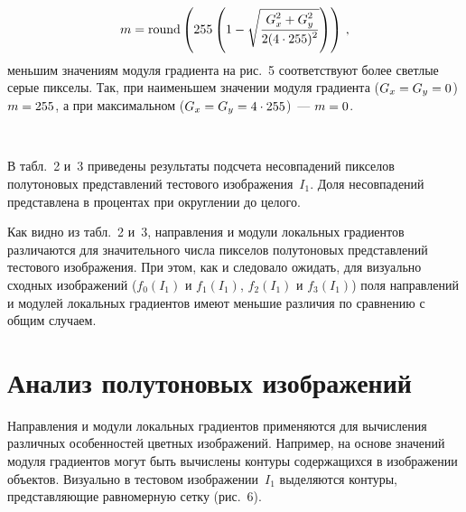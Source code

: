 \begin{multicols}{2}

\noindent
  \begin{equation}
  m = \mbox{round} \left( 255 \left( 1-\sqrt { \displaystyle\frac{\displaystyle G_x^2+G_y^2\mathstrut}{\displaystyle 2(4\cdot
255)^2\mathstrut}}\right)\right)\,,
  \label{e-zyk}
  \end{equation}
меньшим значениям модуля градиента на рис.~5 соответствуют более светлые
серые пикселы. Так, при наименьшем значении модуля градиента
($G_x\hm=G_y\hm=0$) $m\hm=255$, а при максимальном
($G_x\hm=G_y\hm=4\cdot255$)~--- $m\hm=0$.
\setcounter{figure}{6}

\begin{figure*}[b] %
\vspace*{1pt}
\begin{center}
\mbox{%
\epsfxsize=164mm
}
\end{center}
\vspace*{-9pt}
\end{figure*}



  В табл.~2 и~3 приведены результаты подсчета несовпадений пикселов
полутоновых представлений тестового изображения~$I_1$. Доля несовпадений
представлена в процентах при округлении до це\-лого.

  Как видно из табл.~2 и~3, направления и модули локальных градиентов
различаются для значительного числа пикселов полутоновых представлений
тестового изображения. При этом, как и следовало ожидать, для визуально
сходных изображений ($f_0(I_1)$ и $f_1(I_1)$, $f_2(I_1)$ и $f_3(I_1)$) поля
направлений и модулей локальных градиентов имеют меньшие различия по
сравнению с общим случаем.





\section{Анализ полутоновых изображений}

  Направления и модули локальных градиентов применяются для вычисления
различных особенностей цветных изображений. Например, на основе значений
модуля градиентов могут быть вычислены контуры содержащихся в
изображении объектов. Визуально в тестовом изображении~$I_1$ выделяются
контуры, представляющие равномерную сетку (рис.~6).




\end{multicols}
